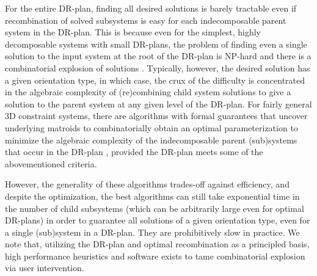 \medskip\noindent
{}
For the entire DR-plan, finding all desired solutions is barely tractable even if recombination of solved subsystems is easy for each indecomposable parent system in the DR-plan. This is because even for the simplest, highly decomposable systems with small DR-plans, the problem of finding even a single solution to the input system at the root of the DR-plan is NP-hard  \cite{saxe1979embeddability} and there is a combinatorial explosion of solutions \cite{borcea2004number}. Typically, however, the desired solution has a given orientation type, in which case, the crux of the difficulty is concentrated in the algebraic complexity of (re)combining child system solutions\cutout{,} to give a solution to the parent system at any given level of the DR-plan. For fairly general 3D constraint systems, there are algorithms with formal guarantees that uncover underlying matroids to combinatorially obtain an optimal parameterization to minimize the algebraic complexity of the indecomposable parent (sub)systems that occur in the DR-plan \cite{sitharam2010optimized,sitharam2006well,sitharam2010reconciling}, provided the DR-plan meets some of the abovementioned criteria.

However, the generality of these algorithms trades-off against efficiency, and despite the optimization, the best algorithms can still take exponential time in the number of child subsystems (which can be arbitrarily large even for optimal DR-plans) in order to guarantee all solutions of a given orientation type, even for a single (sub)system in a DR-plan. They are prohibitively slow in practice. We note that, utilizing the DR-plan and optimal recombination as a principled basis, high performance heuristics and software exists \cite{sitharam2006solution} to tame combinatorial explosion via user intervention.


